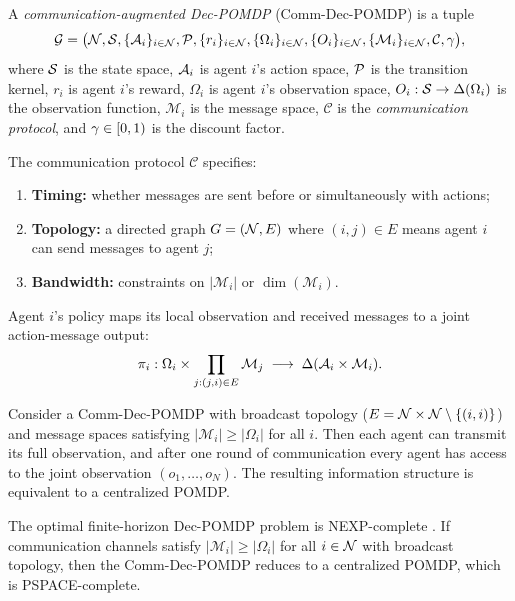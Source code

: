 \documentclass[11pt,a4paper]{article}
\begin{document}
\begin{definition}
\label{def:comm-dec-pomdp}
A \emph{communication-augmented Dec-POMDP} (Comm-Dec-POMDP) is a
tuple
\[
  \mathcal{G} = \bigl(\mathcal{N}, \mathcal{S}, \{\mathcal{A}_i\}_{i \in
  \mathcal{N}}, \mathcal{P}, \{r_i\}_{i \in \mathcal{N}}, \{\Omega_i\}_{i
  \in \mathcal{N}}, \{O_i\}_{i \in \mathcal{N}}, \{\mathcal{M}_i\}_{i
  \in \mathcal{N}}, \mathcal{C}, \gamma \bigr),
\]
where $\mathcal{S}$ is the state space, $\mathcal{A}_i$ is agent $i$'s
action space, $\mathcal{P}$ is the transition kernel, $r_i$ is agent
$i$'s reward, $\Omega_i$ is agent $i$'s observation space,
$O_i : \mathcal{S} \to \Delta(\Omega_i)$ is the observation
function, $\mathcal{M}_i$ is the message space, $\mathcal{C}$
is the \emph{communication protocol}, and $\gamma \in [0,1)$
is the discount factor.

The communication protocol $\mathcal{C}$ specifies:
\begin{enumerate}[nosep]
  \item \textbf{Timing:} whether messages are sent before or
    simultaneously with actions;
  \item \textbf{Topology:} a directed graph $G = (\mathcal{N}, E)$
    where $(i,j) \in E$ means agent $i$ can send messages to
    agent $j$;
  \item \textbf{Bandwidth:} constraints on $|\mathcal{M}_i|$ or
    $\dim(\mathcal{M}_i)$.
\end{enumerate}

Agent $i$'s policy maps its local observation and received
messages to a joint action-message output:
\[
  \pi_i : \Omega_i \times \prod_{j : (j,i) \in E}
  \mathcal{M}_j \;\longrightarrow\; \Delta(\mathcal{A}_i \times
  \mathcal{M}_i).
\]
\end{definition}

\begin{remark}
\label{rem:centralized-reduction}
Consider a Comm-Dec-POMDP with broadcast topology ($E = \mathcal{N}
\times \mathcal{N} \setminus \{(i,i)\}$) and message spaces
satisfying $|\mathcal{M}_i| \geq |\Omega_i|$ for all $i$.  Then
each agent can transmit its full observation, and after one round
of communication every agent has access to the joint observation
$(o_1, \ldots, o_N)$.  The resulting information structure is
equivalent to a centralized POMDP.
\end{remark}

\begin{proposition}
\label{prop:complexity-reduction}
The optimal finite-horizon Dec-POMDP problem is NEXP-complete
\citep{busoniu2008}.  If communication channels satisfy
$|\mathcal{M}_i| \geq |\Omega_i|$ for all $i \in \mathcal{N}$ with
broadcast topology, then the Comm-Dec-POMDP reduces to a
centralized POMDP, which is PSPACE-complete.
\end{proposition}
\end{document}
